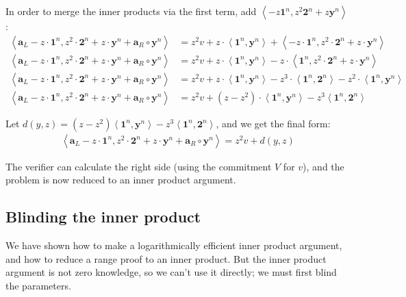 \documentclass{article}
\begin{document}
In order to merge the inner products via the first term, add $\left<-z \textbf{1}^n, z^2 \textbf{2}^n + z \textbf{y}^n\right>$:
\begin{align}
  \left<\textbf{a}_L - z \cdot \textbf{1}^n, z^2 \cdot \textbf{2}^n + z \cdot \textbf{y}^n + \textbf{a}_R \circ \textbf{y}^n\right> &= z^2 v + z \cdot \left<\textbf{1}^n, \textbf{y}^n\right> + \left<-z \cdot \textbf{1}^n, z^2 \cdot \textbf{2}^n + z \cdot \textbf{y}^n\right>\nonumber\\
  \left<\textbf{a}_L - z \cdot \textbf{1}^n, z^2 \cdot \textbf{2}^n + z \cdot \textbf{y}^n + \textbf{a}_R \circ \textbf{y}^n\right> &= z^2 v + z \cdot \left<\textbf{1}^n, \textbf{y}^n\right> - z \cdot \left<\textbf{1}^n, z^2 \cdot \textbf{2}^n + z \cdot \textbf{y}^n\right>\nonumber\\
  \left<\textbf{a}_L - z \cdot \textbf{1}^n, z^2 \cdot \textbf{2}^n + z \cdot \textbf{y}^n + \textbf{a}_R \circ \textbf{y}^n\right> &= z^2 v + z \cdot \left<\textbf{1}^n, \textbf{y}^n\right> - z^3 \cdot \left<\textbf{1}^n, \textbf{2}^n\right> - z^2 \cdot \left<\textbf{1}^n, \textbf{y}^n\right>\nonumber\\
  \left<\textbf{a}_L - z \cdot \textbf{1}^n, z^2 \cdot \textbf{2}^n + z \cdot \textbf{y}^n + \textbf{a}_R \circ \textbf{y}^n\right> &= z^2 v + (z - z^2) \cdot \left<\textbf{1}^n, \textbf{y}^n\right> - z^3 \left<\textbf{1}^n, \textbf{2}^n\right>\nonumber
\end{align}
  
Let $d(y,z) = (z - z^2) \left<\textbf{1}^n, \textbf{y}^n\right> - z^3 \left<\textbf{1}^n, \textbf{2}^n\right>$, and we get the final form:
\begin{align}
  \left<\textbf{a}_L - z \cdot \textbf{1}^n, z^2 \cdot \textbf{2}^n + z \cdot \textbf{y}^n + \textbf{a}_R \circ \textbf{y}^n\right> = z^2 v + d(y,z)
\end{align}

The verifier can calculate the right side (using the commitment $V$ for $v$), and the problem is now reduced to an inner product argument.


\subsection{Blinding the inner product}

We have shown how to make a logarithmically efficient inner product argument, and how to reduce a range proof to an inner product.  But the inner product argument is not zero knowledge, so we can't use it directly; we must first blind the parameters.
\end{document}
